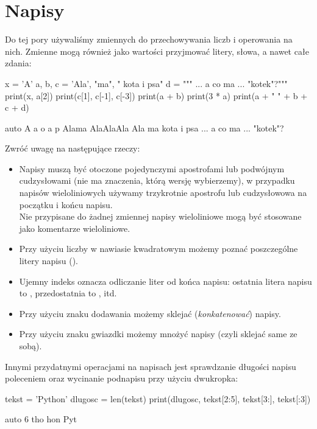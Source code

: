 \documentclass{pdfBooklets}
\begin{document}
\student{\clearpage}
\section{Napisy}
Do tej pory używaliśmy zmiennych do przechowywania liczb i operowania na nich. Zmienne mogą również jako wartości przyjmować litery, słowa, a nawet całe zdania:

\begin{CodeFrame}[python]{.5\textwidth}
x = 'A'
a, b, c = 'Ala', "ma", " kota i psa"
d = """ ... a co ma ...
 "kotek"?"""
print(x, a[2])
print(c[1], c[-1], c[-3])
print(a + b)
print(3 * a)
print(a + " " + b + c + d)
\end{CodeFrame}
\begin{CodeFrame}{auto}
A a
o a p
Alama
AlaAlaAla
Ala ma kota i psa ... a co ma ...
 "kotek"?
\end{CodeFrame}

\pagebreak[2]\noindent
Zwróć uwagę na następujące rzeczy:
\begin{itemize}
\item Napisy muszą być otoczone pojedynczymi apostrofami lub podwójnym cudzysłowami (nie ma znaczenia,
	którą wersję wybierzemy), w przypadku napisów wieloliniowych używamy trzykrotnie apostrofu lub cudzysłowowa na początku i końcu napisu.\\
	Nie przypisane do żadnej zmiennej napisy wieloliniowe mogą być stosowane jako komentarze wieloliniowe.
\item Przy użyciu liczby w nawiasie kwadratowym możemy poznać poszczególne litery napisu ().
\item Ujemny indeks oznacza odliczanie liter od końca napisu: ostatnia litera napisu  to ,
	przedostatnia to , itd.
\item Przy użyciu znaku dodawania możemy sklejać (\emph{konkatenować}) napisy.
\item Przy użyciu znaku gwiazdki możemy mnożyć napisy (czyli sklejać same ze sobą).
\end{itemize}
Innymi przydatnymi operacjami na napisach jest sprawdzanie długości napisu poleceniem 
oraz wycinanie podnapisu przy użyciu dwukropka:

\begin{CodeFrame}[python]{.7\textwidth}
tekst = 'Python'
dlugosc = len(tekst)
print(dlugosc, tekst[2:5], tekst[3:], tekst[:3])
\end{CodeFrame}
\begin{CodeFrame}{auto}
6 tho hon Pyt
\end{CodeFrame}
\end{document}

